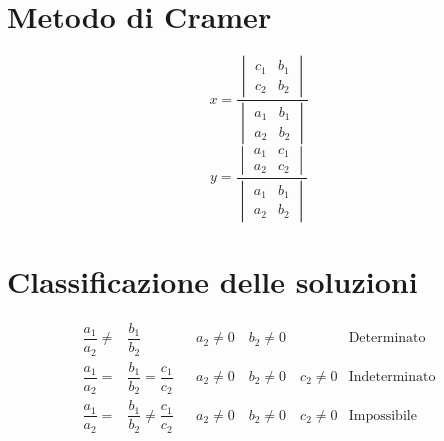 \section{Metodo di Cramer}
\begin{equation*}
x=\dfrac{\begin{vmatrix}
	c_{1}&b_{1}\\
	c_2&b_2
	\end{vmatrix}}{\begin{vmatrix}
	a_{1}&b_{1}\\
	a_2&b_2
	\end{vmatrix}}
\end{equation*}
\begin{equation*}
y=\dfrac{\begin{vmatrix}
	a_{1}&c_{1}\\
	a_2&c_2
	\end{vmatrix}}{\begin{vmatrix}
	a_{1}&b_{1}\\
	a_2&b_2
	\end{vmatrix}}
\end{equation*}
\section{Classificazione delle soluzioni}
\begin{align*}
\dfrac{a_1}{a_2}\neq&\dfrac{b_1}{b_2}& &a_2\neq 0\quad b_2\neq 0&\text{Determinato}\\
\dfrac{a_1}{a_2}=&\dfrac{b_1}{b_2}=\dfrac{c_1}{c_2}& &a_2\neq 0\quad b_2\neq 0\quad c_2\neq 0&\text{Indeterminato}\\
\dfrac{a_1}{a_2}=&\dfrac{b_1}{b_2}\neq\dfrac{c_1}{c_2}& &a_2\neq 0\quad b_2\neq 0\quad c_2\neq 0&\text{Impossibile}\\
\end{align*}